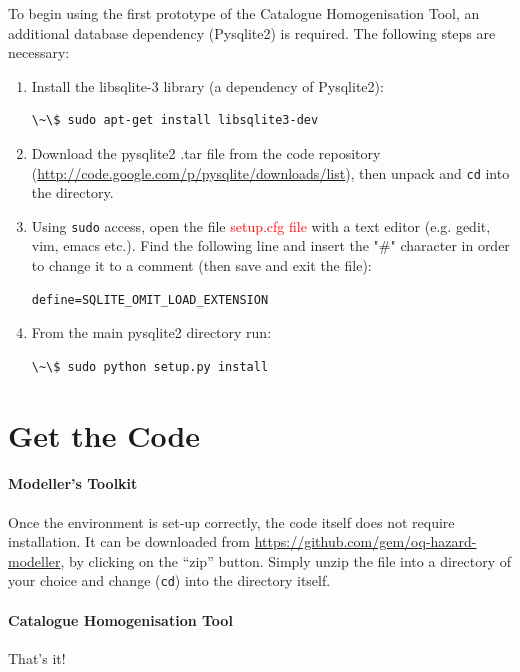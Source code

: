 To begin using the first prototype of the Catalogue Homogenisation Tool, an additional database dependency (Pysqlite2) is required. The following steps are necessary:
\begin{enumerate}

\item Install the libsqlite-3 library (a dependency of Pysqlite2):

\begin{Verbatim}[frame=single, commandchars=\\\{\}, fontsize=\scriptsize]
\~\$ sudo apt-get install libsqlite3-dev
\end{Verbatim}

\item Download the pysqlite2 .tar file from the code repository (\href{http://code.google.com/p/pysqlite/downloads/list}{http://code.google.com/p/pysqlite/downloads/list}), then unpack and \verb*=cd= into the directory.

\item Using \verb*=sudo= access, open the file \textcolor{red}{setup.cfg file} with a text editor (e.g. gedit, vim, emacs etc.). Find the following line and insert the "\#" character in order to change it to a comment (then save and exit the file):
\begin{Verbatim}[frame=single, commandchars=\\\{\}, fontsize=\scriptsize]
define=SQLITE_OMIT_LOAD_EXTENSION
\end{Verbatim} 

\item From the main pysqlite2 directory run:
 \begin{Verbatim}[frame=single, commandchars=\\\{\}, fontsize=\scriptsize]
\~\$ sudo python setup.py install
\end{Verbatim}

\end{enumerate}

\section{Get the Code}

\paragraph{Modeller's Toolkit}

Once the environment is set-up correctly, the code itself does not require installation. It can be downloaded from \href{https://github.com/gem/oq-hazard-modeller}{https://github.com/gem/oq-hazard-modeller}, by clicking on the "`zip"' button. Simply unzip the file into a directory of your choice and change (\verb*=cd=) into the directory itself. 

\paragraph{Catalogue Homogenisation Tool}

That's it!

 